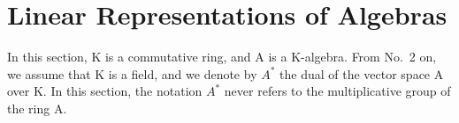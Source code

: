 \section{Linear Representations of Algebras}

In this section, K is a commutative ring, and A is a K-algebra. From No.~2 on, we assume that K is a field, and we denote by \(A^{*}\) the dual of the vector space A over K. In this section, the notation \(A^{*}\) never refers to the multiplicative group of the ring A.

